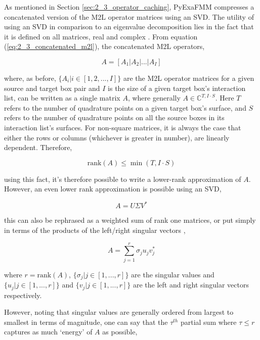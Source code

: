 As mentioned in Section \ref{sec:2_3_operator_caching}, \gls{PyExaFMM} compresses
a concatenated version of the \gls{M2L} operator matrices using an \gls{SVD}.
The utility of using an SVD in comparison to an eigenvalue decomposition lies
in the fact that it is defined on all matrices, real and complex
\cite{Trefethen:1997:SIAM}. From equation (\ref{eq:2_3_concatenated_m2l}), the
concatenated M2L operators,

\begin{equation}
    A = \left [ A_1 | A_2 | ... | A_I \right]
\end{equation}

where, as before, $\{A_i | i \in [1, 2, ..., I]\}$ are the M2L operator matrices
for a given source and target box pair and $I$ is the size of a given target box's
interaction list, can be written as a single matrix $A$, where generally
$A \in \mathbb{C}^{T, I \cdot S}$. Here $T$ refers to the number of quadrature
points on a given target box's surface, and $S$ refers to the number of quadrature
points on all the source boxes in its interaction list's surfaces. For non-square
matrices, it is always the case that either the rows or columns (whichever is
greater in number), are linearly dependent. Therefore,

\begin{equation}
    \text{rank}(A) \leq \min (T, I \cdot S)
\end{equation}

using this fact, it's therefore possible to write a lower-rank approximation of $A$.
However, an even lower rank approximation is possible using an SVD,

\begin{equation}
    A = U \Sigma V^*
\end{equation}

this can also be rephrased as a weighted sum of rank one matrices, or put simply
in terms of the products of the left/right singular vectors \cite{Trefethen:1997:SIAM},

\begin{equation}
    A = \sum_{j=1}^{r}\sigma_j u_j v_j^*
\end{equation}

where $r = \text{rank} (A)$, $\{\sigma_j | j \in [1, ..., r] \}$ are the singular
values and $\{u_j | j \in [1, ..., r] \} $ and $\{v_j | j \in [1, ..., r] \}$
are the left and right singular vectors respectively.

However, noting that singular values are generally ordered from largest to smallest
in terms of magnitude, one can say that the $\tau^{th}$ partial sum where
$\tau \leq r$ captures as much `energy' of $A$ as possible,


